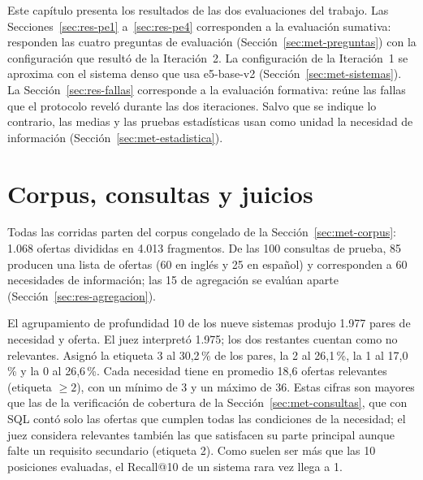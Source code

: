 

Este capítulo presenta los resultados de las dos evaluaciones del trabajo. Las Secciones~\ref{sec:res-pe1} a~\ref{sec:res-pe4} corresponden a la evaluación sumativa: responden las cuatro preguntas de evaluación (Sección~\ref{sec:met-preguntas}) con la configuración que resultó de la Iteración~2. La configuración de la Iteración~1 se aproxima con el sistema denso que usa e5-base-v2 (Sección~\ref{sec:met-sistemas}). La Sección~\ref{sec:res-fallas} corresponde a la evaluación formativa: reúne las fallas que el protocolo reveló durante las dos iteraciones. Salvo que se indique lo contrario, las medias y las pruebas estadísticas usan como unidad la necesidad de información (Sección~\ref{sec:met-estadistica}).

\section{Corpus, consultas y juicios}
\label{sec:res-corpus}

Todas las corridas parten del corpus congelado de la Sección~\ref{sec:met-corpus}: 1.068 ofertas divididas en 4.013 fragmentos. De las 100 consultas de prueba, 85 producen una lista de ofertas (60 en inglés y 25 en español) y corresponden a 60 necesidades de información; las 15 de agregación se evalúan aparte (Sección~\ref{sec:res-agregacion}).

El agrupamiento de profundidad 10 de los nueve sistemas produjo 1.977 pares de necesidad y oferta. El juez interpretó 1.975; los dos restantes cuentan como no relevantes. Asignó la etiqueta 3 al 30,2\,\% de los pares, la 2 al 26,1\,\%, la 1 al 17,0\,\% y la 0 al 26,6\,\%. Cada necesidad tiene en promedio 18,6 ofertas relevantes (etiqueta $\geq 2$), con un mínimo de 3 y un máximo de 36. Estas cifras son mayores que las de la verificación de cobertura de la Sección~\ref{sec:met-consultas}, que con SQL contó solo las ofertas que cumplen todas las condiciones de la necesidad; el juez considera relevantes también las que satisfacen su parte principal aunque falte un requisito secundario (etiqueta 2). Como suelen ser más que las 10 posiciones evaluadas, el Recall@10 de un sistema rara vez llega a 1.

